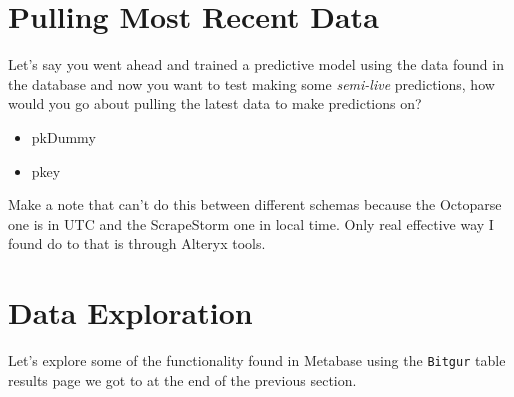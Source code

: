 \documentclass[]{book}
\begin{document}
\hypertarget{pulling-most-recent-data}{%
\section{Pulling Most Recent Data}\label{pulling-most-recent-data}}

Let's say you went ahead and trained a predictive model using the data found in the database and now you want to test making some \emph{semi-live} predictions, how would you go about pulling the latest data to make predictions on?

\begin{itemize}
\item
  pkDummy
\item
  pkey
\end{itemize}

Make a note that can't do this between different schemas because the Octoparse one is in UTC and the ScrapeStorm one in local time. Only real effective way I found do to that is through Alteryx tools.

\hypertarget{data-exploration}{%
\section{Data Exploration}\label{data-exploration}}

Let's explore some of the functionality found in Metabase using the \texttt{Bitgur} table results page we got to at the end of the previous section.
\end{document}
